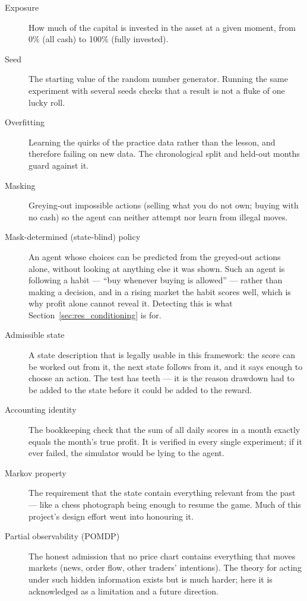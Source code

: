 \begin{description}
  \item[Exposure] How much of the capital is invested in the asset at a
  given moment, from 0\% (all cash) to 100\% (fully invested).

  \item[Seed] The starting value of the random number generator. Running
  the same experiment with several seeds checks that a result is not a
  fluke of one lucky roll.

  \item[Overfitting] Learning the quirks of the practice data rather
  than the lesson, and therefore failing on new data. The chronological
  split and held-out months guard against it.

  \item[Masking] Greying-out impossible actions (selling what you do not
  own; buying with no cash) so the agent can neither attempt nor learn
  from illegal moves.

  \item[Mask-determined (state-blind) policy] An agent whose choices can be
  predicted from the greyed-out actions alone, without looking at anything
  else it was shown. Such an agent is following a habit --- ``buy whenever
  buying is allowed'' --- rather than making a decision, and in a rising
  market the habit scores well, which is why profit alone cannot reveal it.
  Detecting this is what Section~\ref{sec:res_conditioning} is for.

  \item[Admissible state] A state description that is legally usable in this
  framework: the score can be worked out from it, the next state follows from
  it, and it says enough to choose an action. The test has teeth --- it is the
  reason drawdown had to be added to the state before it could be added to
  the reward.

  \item[Accounting identity] The bookkeeping check that the sum of all
  daily scores in a month exactly equals the month's true profit. It is
  verified in every single experiment; if it ever failed, the simulator
  would be lying to the agent.

  \item[Markov property] The requirement that the state contain
  everything relevant from the past --- like a chess photograph being
  enough to resume the game. Much of this project's design effort went
  into honouring it.

  \item[Partial observability (POMDP)] The honest admission that no
  price chart contains everything that moves markets (news, order flow,
  other traders' intentions). The theory for acting under such hidden
  information exists but is much harder; here it is acknowledged as a
  limitation and a future direction.

\end{description}
